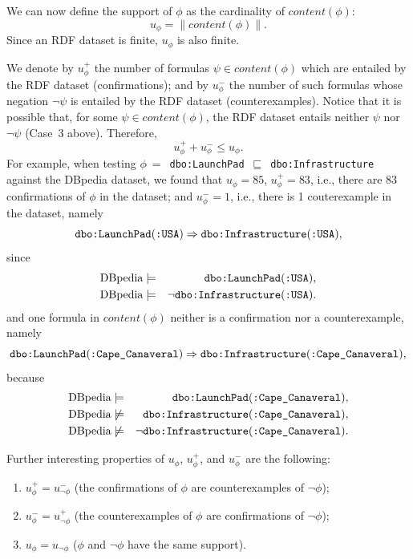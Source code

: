 \documentclass{llncs}
\begin{document}
We can now define the support of $\phi$ as the cardinality of $content(\phi)$:
\begin{equation}\label{eq:support}
    u_\phi = \|content(\phi)\|.
\end{equation}
Since an RDF dataset is finite, $u_\phi$ is also finite.

We denote by $u_\phi^+$ the number of formulas $\psi \in content(\phi)$
which are entailed by the RDF dataset (confirmations);
and by $u_\phi^-$ the number of such formulas
whose negation $\neg\psi$ is entailed by the RDF dataset (counterexamples).
Notice that it is possible that, for some $\psi \in content(\phi)$,
the RDF dataset entails neither $\psi$ nor $\neg\psi$ (Case~3 above). Therefore,
\begin{equation}
  u_\phi^+ + u_\phi^- \leq u_\phi.\label{eq:conf-pls-expt-lt-refc}
\end{equation}
For example, when testing
$\phi~=$~\texttt{dbo:LaunchPad}~$\sqsubseteq$~\texttt{dbo:Infrastructure} against the DBpedia dataset,
we found that $u_\phi = 85$,
$u_\phi^+ = 83$, i.e., there are 83 confirmations of $\phi$ in the dataset; 
and $u_\phi^- = 1$, i.e., there is 1 couterexample in the dataset, namely
\[
  \mbox{\tt dbo:LaunchPad}(\mbox{\tt :USA}) \Rightarrow
  \mbox{\tt dbo:Infrastructure}(\mbox{\tt :USA}),
\]
since
\begin{eqnarray*}
  \mbox{DBpedia} &\models& \mbox{\tt dbo:LaunchPad}(\mbox{\tt :USA}),\\
  \mbox{DBpedia} &\models& \neg\mbox{\tt dbo:Infrastructure}(\mbox{\tt :USA}).
\end{eqnarray*}
and one formula in $content(\phi)$ neither is a confirmation nor a counterexample, namely
\[
  \mbox{\tt dbo:LaunchPad}(\mbox{\tt :Cape\_Canaveral}) \Rightarrow
  \mbox{\tt dbo:Infrastructure}(\mbox{\tt :Cape\_Canaveral}),
\]
because
\begin{eqnarray*}
  \mbox{DBpedia} &\models& \mbox{\tt dbo:LaunchPad}(\mbox{\tt :Cape\_Canaveral}),\\
  \mbox{DBpedia} &\not\models& \mbox{\tt dbo:Infrastructure}(\mbox{\tt :Cape\_Canaveral}),\\
  \mbox{DBpedia} &\not\models& \neg\mbox{\tt dbo:Infrastructure}(\mbox{\tt :Cape\_Canaveral}).
\end{eqnarray*}


Further interesting properties of $u_\phi$, $u^+_\phi$, and $u^-_\phi$ are the following:
\begin{enumerate}
\item $u_\phi^+ = u_{\neg\phi}^-$ (the confirmations of $\phi$ are counterexamples of $\neg\phi$);
\item $u_\phi^- = u_{\neg\phi}^+$ (the counterexamples of $\phi$ are confirmations of $\neg\phi$);
\item $u_\phi = u_{\neg\phi}$ ($\phi$ and $\neg\phi$ have the same support).
\end{enumerate}
\end{document}
